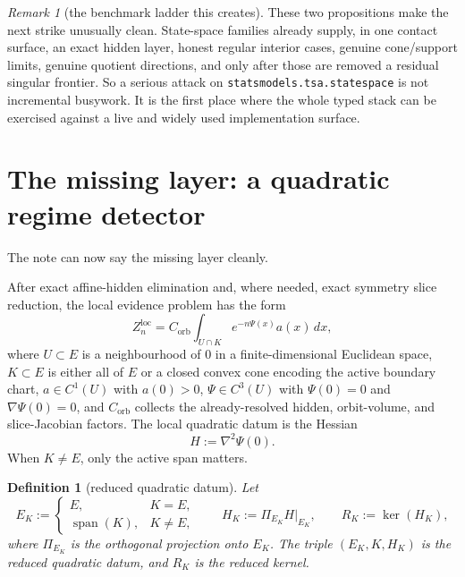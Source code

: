 \documentclass[11pt,a4paper]{article}
\numberwithin{equation}{section}
\DeclareMathOperator{\spanop}{span}
\theoremstyle{thmcompact}
\newtheorem{definition}[theorem]{Definition}
\theoremstyle{remark}
\newtheorem*{remarkplain}{Remark}
\newenvironment{remark}[1][]%
{\begin{remarkbox}\begin{remarkplain}[#1]\normalfont}
{\end{remarkplain}\end{remarkbox}}
\begin{document}
\begin{remark}[the benchmark ladder this creates]
These two propositions make the next strike unusually clean. State-space families already supply, in one contact surface, an exact hidden layer, honest regular interior cases, genuine cone/support limits, genuine quotient directions, and only after those are removed a residual singular frontier. So a serious attack on \texttt{statsmodels.tsa.statespace} is not incremental busywork. It is the first place where the whole typed stack can be exercised against a live and widely used implementation surface.
\end{remark}

\section{The missing layer: a quadratic regime detector}

The note can now say the missing layer cleanly.

After exact affine-hidden elimination and, where needed, exact symmetry slice reduction, the local evidence problem has the form
\[
Z_n^{\mathrm{loc}}
=
C_{\mathrm{orb}}
\int_{U\cap K} e^{-n\Psi(x)} a(x)\,dx,
\]
where $U\subset E$ is a neighbourhood of $0$ in a finite-dimensional Euclidean space, $K\subset E$ is either all of $E$ or a closed convex cone encoding the active boundary chart, $a\in C^1(U)$ with $a(0)>0$, $\Psi\in C^3(U)$ with $\Psi(0)=0$ and $\nabla\Psi(0)=0$, and $C_{\mathrm{orb}}$ collects the already-resolved hidden, orbit-volume, and slice-Jacobian factors. The local quadratic datum is the Hessian
\[
H:=\nabla^2\Psi(0).
\]
When $K\neq E$, only the active span matters.

\begin{definition}[reduced quadratic datum]
Let
\[
E_K:=
\begin{cases}
E,& K=E,\\
\spanop(K),& K\neq E,
\end{cases}
\qquad
H_K:=\Pi_{E_K}H|_{E_K},
\qquad
R_K:=\ker(H_K),
\]
where $\Pi_{E_K}$ is the orthogonal projection onto $E_K$. The triple $(E_K,K,H_K)$ is the \emph{reduced quadratic datum}, and $R_K$ is the \emph{reduced kernel}.
\end{definition}
\end{document}
